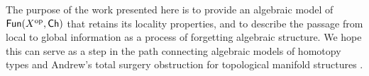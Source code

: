 The purpose of the work presented here is to provide an algebraic model of $\mathsf{Fun}(X^{\mathrm{op}},\mathsf{Ch})$ that retains its locality properties, and to describe the passage from local to global information as a process of forgetting algebraic structure.
We hope this can serve as a step in the path connecting algebraic models of homotopy types \cite{quillen1969rational, sullivan1977infinitesimal,mandell2001padic} and Andrew's total surgery obstruction for topological manifold structures \cite{ranicki1979obstruction,ranicki1992topological,macko2013obstruction}.